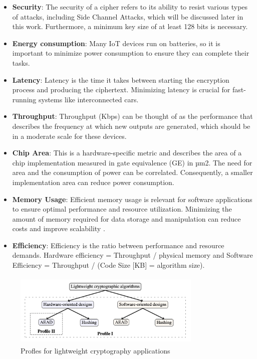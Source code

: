 \begin{itemize}
    \setlength{\itemsep}{-5pt}
    \item \textbf{Security}: The security of a cipher refers to its ability to resist various types of attacks, including Side Channel Attacks, which will be discussed later in this work. Furthermore, a minimum key size of at least 128 bits is necessary.
    \item \textbf{Energy consumption}: Many IoT devices run on batteries, so it is important to minimize power consumption to ensure they can complete their tasks.
    \item \textbf{Latency}: Latency is the time it takes between starting the encryption process and producing the ciphertext. Minimizing latency is crucial for fast-running systems like interconnected cars.
    \item \textbf{Throughput}: Throughput (Kbps) can be thought of as the performance that describes the frequency at which new outputs are generated, which should be in a moderate scale for these devices.
    \item \textbf{Chip Area}: This is a hardware-specific metric and describes the area of a chip implementation measured in gate equivalence (GE) in µm2. The need for area and the consumption of power can be correlated. Consequently, a smaller implementation area can reduce power consumption.
    \item \textbf{Memory Usage}: Efficient memory usage is relevant for software applications to ensure optimal performance and resource utilization. Minimizing the amount of memory required for data storage and manipulation can reduce costs and improve scalability \cite{mckay2016report}.
    \item \textbf{Efficiency}: Efficiency is the ratio between performance and resource demands. Hardware efficiency = Throughput / physical memory and Software Efficiency = Throughput / (Code Size [KB] = algorithm size).
\end{itemize}

\begin{figure}[h]
    \centering
    \includegraphics[width=9.0cm, height=3.5cm]{media/profiles.png}
    \caption{Profles for lightweight cryptography applications}
    \label{fig:profiles}
\end{figure}

